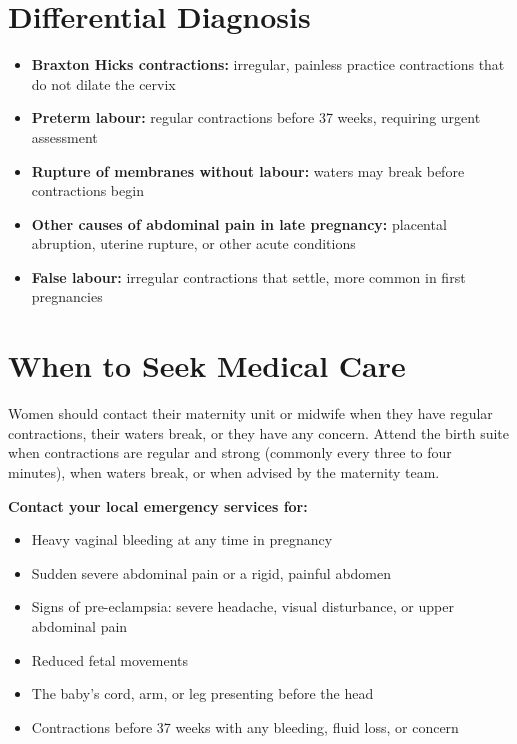 \section*{Differential Diagnosis}
\begin{itemize}
    \item \textbf{Braxton Hicks contractions:} irregular, painless practice contractions that do not dilate the cervix
    \item \textbf{Preterm labour:} regular contractions before 37 weeks, requiring urgent assessment
    \item \textbf{Rupture of membranes without labour:} waters may break before contractions begin
    \item \textbf{Other causes of abdominal pain in late pregnancy:} placental abruption, uterine rupture, or other acute conditions
    \item \textbf{False labour:} irregular contractions that settle, more common in first pregnancies
\end{itemize}

\section*{When to Seek Medical Care}
Women should contact their maternity unit or midwife when they have regular contractions, their waters break, or they have any concern. Attend the birth suite when contractions are regular and strong (commonly every three to four minutes), when waters break, or when advised by the maternity team.

\textbf{Contact your local emergency services for:}
\begin{itemize}
    \item Heavy vaginal bleeding at any time in pregnancy
    \item Sudden severe abdominal pain or a rigid, painful abdomen
    \item Signs of pre-eclampsia: severe headache, visual disturbance, or upper abdominal pain
    \item Reduced fetal movements
    \item The baby's cord, arm, or leg presenting before the head
    \item Contractions before 37 weeks with any bleeding, fluid loss, or concern
\end{itemize}

